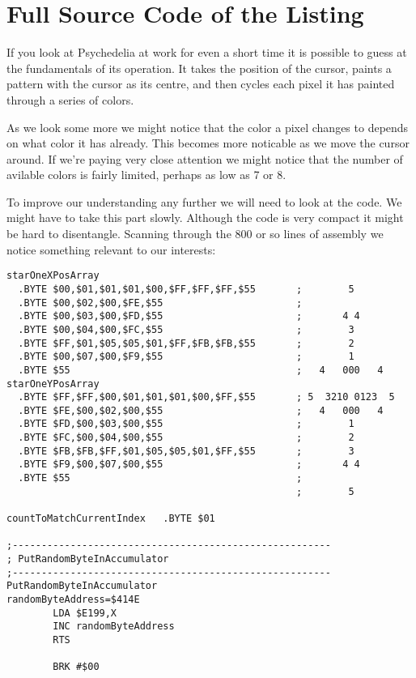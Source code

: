 \chapter{Full Source Code of the Listing} 
\lstset{style=6502Style}
If you look at Psychedelia at work for even a short time it is possible to guess at the fundamentals
of its operation. It takes the position of the cursor, paints a pattern with the cursor as its centre,
and then cycles each pixel it has painted through a series of colors.

As we look some more we might notice that the color a pixel changes to depends on what color it has already.
This becomes more noticable as we move the cursor around. If we're paying very close attention we might notice
that the number of avilable colors is fairly limited, perhaps as low as 7 or 8.

To improve our understanding any further we will need to look at the code. We might have to take this part slowly.
Although the code is very compact it might be hard to disentangle. Scanning through the 800 or so lines of assembly
we notice something relevant to our interests:

\clearpage
\begin{lstlisting}
starOneXPosArray
  .BYTE $00,$01,$01,$01,$00,$FF,$FF,$FF,$55       ;        5       
  .BYTE $00,$02,$00,$FE,$55                       ;                
  .BYTE $00,$03,$00,$FD,$55                       ;       4 4      
  .BYTE $00,$04,$00,$FC,$55                       ;        3       
  .BYTE $FF,$01,$05,$05,$01,$FF,$FB,$FB,$55       ;        2       
  .BYTE $00,$07,$00,$F9,$55                       ;        1       
  .BYTE $55                                       ;   4   000   4  
starOneYPosArray
  .BYTE $FF,$FF,$00,$01,$01,$01,$00,$FF,$55       ; 5  3210 0123  5
  .BYTE $FE,$00,$02,$00,$55                       ;   4   000   4  
  .BYTE $FD,$00,$03,$00,$55                       ;        1       
  .BYTE $FC,$00,$04,$00,$55                       ;        2       
  .BYTE $FB,$FB,$FF,$01,$05,$05,$01,$FF,$55       ;        3       
  .BYTE $F9,$00,$07,$00,$55                       ;       4 4      
  .BYTE $55                                       ;                
                                                  ;        5       

countToMatchCurrentIndex   .BYTE $01

;-------------------------------------------------------
; PutRandomByteInAccumulator
;-------------------------------------------------------
PutRandomByteInAccumulator   
randomByteAddress=$414E
        LDA $E199,X
        INC randomByteAddress
        RTS 

        BRK #$00

\end{lstlisting}
\clearpage

